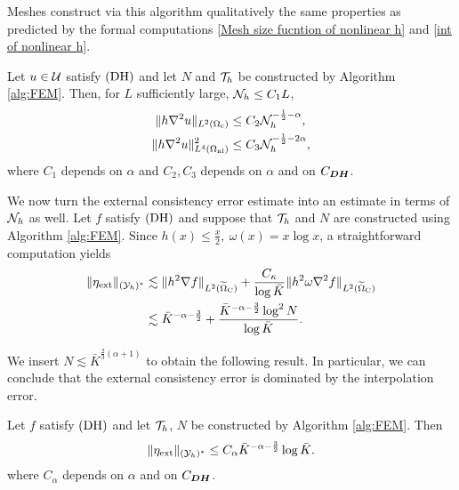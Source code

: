 Meshes construct via this algorithm qualitatively the same properties as predicted by the formal computations \eqref{Mesh size fucntion of nonlinear h} and \eqref{int of nonlinear h}.
\begin{theorem}\label{Decay result of nonlinear best approximation term}
	Let $u\in \mathcal{U}$ satisfy $\textbf{\rm (DH)}$ and let $N$ and $\mathcal{T}_{h}$ be constructed by Algorithm \ref{alg:FEM}. Then, for $L$ sufficiently large, $\mathcal{N}_{h}\le C_{1} L$,
	\begin{equation*}
		\begin{aligned}
			\Vert h\nabla^{2} u\Vert_{L^{2}(\Omega_{{\rm c}})} &\le C_{2} \mathcal{N}_{h}^{-\frac{1}{2}-\alpha},  \\
			\Vert h\nabla^{2} u\Vert^{2}_{L^{4}(\Omega_{{\rm nl}})} &\le C_{3} \mathcal{N}_{h}^{-\frac{1}{2}-2\alpha},
		\end{aligned}
	\end{equation*}
	where $C_{1}$ depends on $\alpha$ and $C_{2}, C_{3}$ depends on $\alpha$ and on $C_{\bm{DH}}$.
\end{theorem}


We now turn the external consistency error estimate into an estimate in terms of $\mathcal{N}_{h}$ as well. Let $f$ satisfy $\textbf{\rm (DH)}$ and suppose that $\mathcal{T}_{h}$ and $N$ are constructed using Algorithm \ref{alg:FEM}. Since $h(x)\le \frac{x}{2}, \ \omega(x)=x\log x$, a straightforward computation yields
\begin{align*}
	\Vert \eta_{\text{ext}} \Vert_{(\mathcal{Y}_{h})^{*}} &\lesssim \Vert h^{2} \nabla f\Vert_{L^{2}(\widetilde{\Omega}_{{\rm C}})} +\frac{C_{\kappa}}{\log \bar{K}} \Vert h^{2}\omega \nabla^{2}f\Vert_{L^{2}(\widetilde{\Omega}_{{\rm C}})}\\
	&\lesssim \bar{K}^{-\alpha-\frac{3}{2}}+\frac{\bar{K}^{-\alpha-\frac{3}{2}}\log^{2}N}{\log \bar{K}}.
\end{align*}

We insert $N \lesssim \bar{K}^{\frac{2}{3}(\alpha+1)}$ to obtain the following result. In particular, we can conclude that the external consistency error is dominated by the interpolation error.

\begin{theorem}\label{Decay result of nonlinear external force}
	Let $f$ satisfy $\textbf{\rm (DH)}$ and let $\mathcal{T}_{h}$, $N$ be constructed by Algorithm \ref{alg:FEM}. Then
	\begin{equation*}
		\Vert \eta_{\text{ext}} \Vert_{(\mathcal{Y}_{h})^{*}} \le C_{\alpha} \bar{K}^{-\alpha-\frac{3}{2}} \log \bar{K}.
	\end{equation*}
	where $C_{\alpha}$ depends on $\alpha$ and on $C_{\bm{DH}}$.
\end{theorem}


